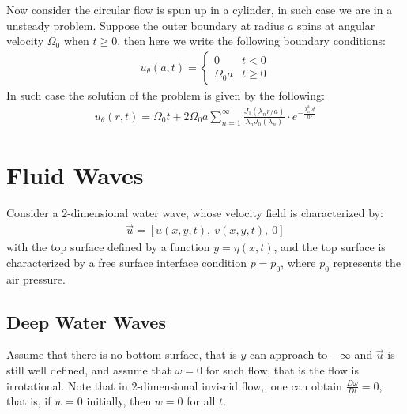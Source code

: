 \documentclass[11pt]{book}
\theoremstyle{break}
\theoremstyle{break}
\begin{document}
Now consider the circular flow is spun up in a cylinder, in such case we are in a unsteady problem. Suppose the outer boundary at radius $a$ spins at angular velocity $\Omega_0$ when $t\geq 0$, then here we write the following boundary conditions:
\begin{align*}
u_{\theta}(a,t) = \begin{cases}
0 & t< 0 \\
\Omega_0 a & t\geq 0
\end{cases}
\end{align*}
In such case the solution of the problem is given by the following:
\begin{align*}
u_{\theta}(r,t) = \Omega_0 t + 2\Omega_0 a \sum_{n=1}^\infty \frac{J_1(\lambda_n r/a)}{\lambda_n J_0(\lambda_n)}\cdot e^{-\frac{\lambda_n^2 \nu t}{n^2}}
\end{align*}

\newpage
\chapter{Fluid Waves}
\setcounter{section}{6}
Consider a $2$-dimensional water wave, whose velocity field is characterized by:
\begin{align*}
\vec{u} = [u(x,y,t),\ v(x,y,t),\ 0]
\end{align*}
with the top surface defined by a function $y = \eta(x,t)$, and the top surface is characterized by a free surface interface condition $p = p_0$, where $p_0$ represents the air pressure. 

\section[Deep Water Waves]{\color{red} Deep Water Waves \color{black}}
Assume that there is no bottom surface, that is $y$ can approach to $-\infty$ and $\vec{u}$ is still well defined, and assume that $\omega = 0$ for such flow, that is the flow is irrotational. Note that in $2$-dimensional inviscid flow,, one can obtain $\frac{D\omega}{Dt}= 0$, that is, if $w = 0$ initially, then $w = 0$ for all $t$. \\
\end{document}
